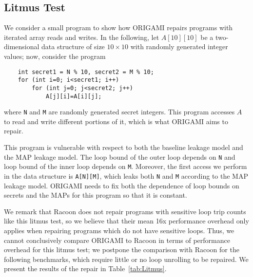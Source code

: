 {\subsection{Litmus Test}
We consider a small program to show how ORIGAMI repairs programs with iterated array reads and writes. In the following, let $A[10][10]$ be a two-dimensional data structure of size $10\times10$ with randomly generated integer values; now, consider the program
{
\begin{verbatim}
    int secret1 = N % 10, secret2 = M % 10;
    for (int i=0; i<secret1; i++)
        for (int j=0; j<secret2; j++)
            A[j][i]=A[i][j];
\end{verbatim}
}
where \texttt{N} and \texttt{M} are randomly generated secret integers. This program accesses $A$ to read and write different portions of it, which is what ORIGAMI aims to repair.

This program is vulnerable with respect to both the baseline leakage model and the MAP leakage model. The loop bound of the outer loop depends on \texttt{N} and loop bound of the inner loop depends on \texttt{M}. Moreover, the first access we perform in the data structure is \texttt{A[N][M]}, which leaks both \texttt{N} and \texttt{M} according to the MAP leakage model. ORIGAMI needs to fix both the dependence of loop bounds on secrets and the MAPs for this program so that it is constant. 

We remark that Racoon does not repair programs with sensitive loop trip counts like this litmus test, so we believe that their mean 16x performance overhead only applies when repairing programs which do not have sensitive loops. Thus, we cannot conclusively compare ORIGAMI to Racoon in terms of performance overhead for this litmus test; we postpone the comparison with Racoon for the following benchmarks, which require little or no loop unrolling to be repaired. We present the results of the repair in Table~\ref{tab:Litmus}. 

}

